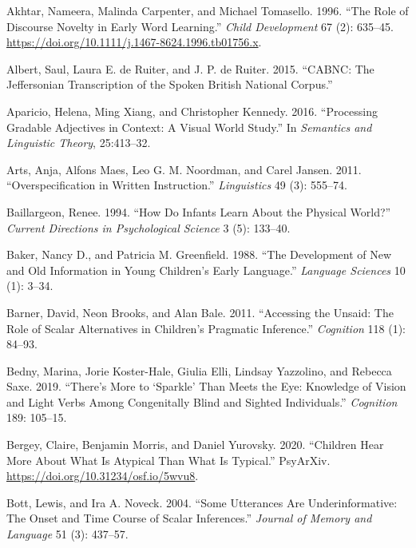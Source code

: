\documentclass{ucetd}
\newlength{\cslhangindent}
\newenvironment{cslreferences}%
{\setlength{\parindent}{0pt}%
\everypar{\setlength{\hangindent}{\cslhangindent}}\ignorespaces}%
{\par}
\begin{document}
\hypertarget{refs}{}
\begin{cslreferences}
\leavevmode\hypertarget{ref-akhtar_role_1996}{}%
Akhtar, Nameera, Malinda Carpenter, and Michael Tomasello. 1996. ``The
Role of Discourse Novelty in Early Word Learning.'' \emph{Child
Development} 67 (2): 635--45.
\url{https://doi.org/10.1111/j.1467-8624.1996.tb01756.x}.

\leavevmode\hypertarget{ref-albert_cabnc_2015}{}%
Albert, Saul, Laura E. de Ruiter, and J. P. de Ruiter. 2015. ``CABNC:
The Jeffersonian Transcription of the Spoken British National Corpus.''

\leavevmode\hypertarget{ref-aparicio2016processing}{}%
Aparicio, Helena, Ming Xiang, and Christopher Kennedy. 2016.
``Processing Gradable Adjectives in Context: A Visual World Study.'' In
\emph{Semantics and Linguistic Theory}, 25:413--32.

\leavevmode\hypertarget{ref-arts_overspecification_2011}{}%
Arts, Anja, Alfons Maes, Leo G. M. Noordman, and Carel Jansen. 2011.
``Overspecification in Written Instruction.'' \emph{Linguistics} 49 (3):
555--74.

\leavevmode\hypertarget{ref-baillargeon1994}{}%
Baillargeon, Renee. 1994. ``How Do Infants Learn About the Physical
World?'' \emph{Current Directions in Psychological Science} 3 (5):
133--40.

\leavevmode\hypertarget{ref-baker1988}{}%
Baker, Nancy D., and Patricia M. Greenfield. 1988. ``The Development of
New and Old Information in Young Children's Early Language.''
\emph{Language Sciences} 10 (1): 3--34.

\leavevmode\hypertarget{ref-barner_accessing_2011}{}%
Barner, David, Neon Brooks, and Alan Bale. 2011. ``Accessing the Unsaid:
The Role of Scalar Alternatives in Children's Pragmatic Inference.''
\emph{Cognition} 118 (1): 84--93.

\leavevmode\hypertarget{ref-bedny2019}{}%
Bedny, Marina, Jorie Koster-Hale, Giulia Elli, Lindsay Yazzolino, and
Rebecca Saxe. 2019. ``There's More to `Sparkle' Than Meets the Eye:
Knowledge of Vision and Light Verbs Among Congenitally Blind and Sighted
Individuals.'' \emph{Cognition} 189: 105--15.

\leavevmode\hypertarget{ref-bergey_morris_2020}{}%
Bergey, Claire, Benjamin Morris, and Daniel Yurovsky. 2020. ``Children
Hear More About What Is Atypical Than What Is Typical.'' PsyArXiv.
\url{https://doi.org/10.31234/osf.io/5wvu8}.

\leavevmode\hypertarget{ref-bott_utterances_2004}{}%
Bott, Lewis, and Ira A. Noveck. 2004. ``Some Utterances Are
Underinformative: The Onset and Time Course of Scalar Inferences.''
\emph{Journal of Memory and Language} 51 (3): 437--57.


\end{cslreferences}
\end{document}
